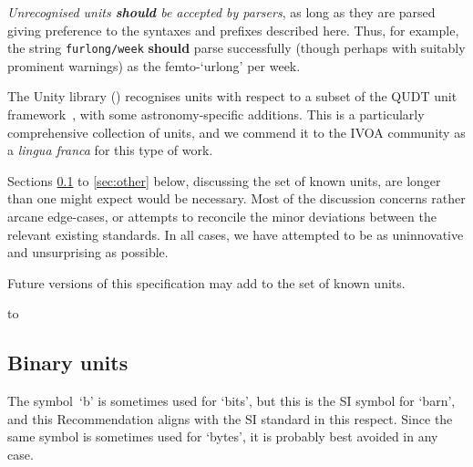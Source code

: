 \documentclass[11pt,a4paper]{ivoa}
\newcommand{\unit}[1]{\texttt{\small\color{orange}#1}}
\newcommand*\norm[1]{\textbf{\color{ivoacolor}#1}}
\begin{document}
\emph{Unrecognised units \norm{should} be accepted by parsers},
as long as they are parsed giving preference to the syntaxes and
prefixes described here.  Thus, for example, the
string \unit{furlong/week} \norm{should} parse successfully (though
perhaps with suitably prominent warnings) as the femto-`urlong' per
week.

The Unity library () recognises units with
respect to a subset of the QUDT unit framework~\citep{qudt}, with some
astronomy-specific additions.  This is a particularly comprehensive
collection of units, and we commend it to the IVOA community as
a \emph{lingua franca} for this type of work.

Sections \ref{sec:binary} to \ref{sec:other} below, discussing the set
of known units, are longer than one might expect would be necessary.
Most of the discussion concerns rather arcane edge-cases, or attempts
to reconcile the minor deviations between the relevant existing
standards.  In all cases, we have attempted to be as uninnovative and
unsurprising as possible.

Future versions of this specification may add to the set of known units.

\begin{table}
\hbox to 
\caption[Known units in the various syntaxes]
{\label{tabx:knownunits}Known units in the various syntaxes.
In the table, and for a given syntax, a `$\cdot$' indicates that the unit is recognised,
an~`s' that it is additionally permitted to have SI prefixes,
a~`b' that binary prefixes will be recognised,
and a~`d' that it is recognised but deprecated.
For those units which have alternative symbols for a given unit,
a~`p' indicates the one preferred for output.}
\end{table}

\subsection{Binary units}
\label{sec:binary}

The symbol~`b' is sometimes used for `bits', but this is the SI symbol
for `barn', and this Recommendation aligns with the SI standard in
this respect.  Since the same symbol is sometimes used for `bytes', it
is probably best avoided in any case.
\end{document}
